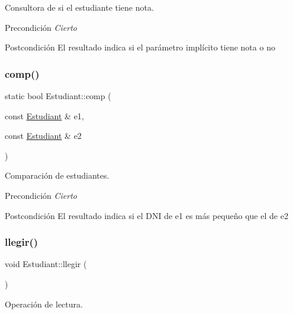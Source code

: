 Consultora de si el estudiante tiene nota. 

\begin{DoxyPrecond}{Precondición}
{\itshape Cierto} 
\end{DoxyPrecond}
\begin{DoxyPostcond}{Postcondición}
El resultado indica si el parámetro implícito tiene nota o no 
\end{DoxyPostcond}
\mbox{\label{class_estudiant_a5f19b7f7436e8c12a13159335040ae42}} 
\subsubsection{\texorpdfstring{comp()}{comp()}}
{\footnotesize\ttfamily static bool Estudiant\+::comp (\begin{DoxyParamCaption}\item[{const \hyperlink{class_estudiant}{Estudiant} \&}]{e1,  }\item[{const \hyperlink{class_estudiant}{Estudiant} \&}]{e2 }\end{DoxyParamCaption})\hspace{0.3cm}{\ttfamily [static]}}



Comparación de estudiantes. 

\begin{DoxyPrecond}{Precondición}
{\itshape Cierto} 
\end{DoxyPrecond}
\begin{DoxyPostcond}{Postcondición}
El resultado indica si el D\+NI de e1 es más pequeño que el de e2 
\end{DoxyPostcond}
\mbox{\label{class_estudiant_af5c4883975828647dfb5ffc6735740e6}} 
\subsubsection{\texorpdfstring{llegir()}{llegir()}}
{\footnotesize\ttfamily void Estudiant\+::llegir (\begin{DoxyParamCaption}{ }\end{DoxyParamCaption})}



Operación de lectura. 

